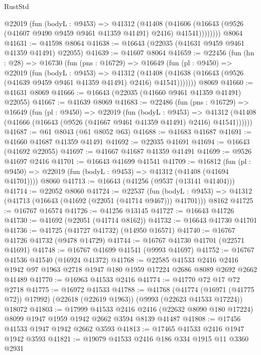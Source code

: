 \begin{lexlean}{RustStd}
\begin{coremodule}
          @22019
            (fun (bodyL : @9453) =>
            @41312
              (@41408
                (@41606
                  (@16643 (@9526 (@41607 @9490 @9459 @9461 @41359 @41491) @2416) @41541))))))))
    @8064
@41631 := @41598 @8064
@41638 := @16643 (@22035 (@41631 @9459 @9461 @41359 @41491) @22055)
@41639 := @41607 @8064
@41659 := @22456
    (fun (hn : @28) =>
    @16730
      (fun (pns : @16729) =>
      @16649
        (fun (pl : @9450) =>
        @22019
          (fun (bodyL : @9453) =>
          @41312
            (@41408 (@41638 (@16643 (@9526 (@41639 @9459 @9461 @41359 @41491) @2416) @41541)))))))
    @8069
@41660 := @41631 @8069
@41666 := @16643 (@22035 (@41660 @9461 @41359 @41491) @22055)
@41667 := @41639 @8069
@41683 := @22486
    (fun (pns : @16729) =>
    @16649
      (fun (pl : @9450) =>
      @22019
        (fun (bodyL : @9453) =>
        @41312 (@41408 (@41666 (@16643 (@9526 (@41667 @9461 @41359 @41491) @2416) @41541))))))
@41687 := @61 @8043 (@61 @8052 @63)
@41688 := @41683 @41687
@41691 := @41660 @41687 @41359 @41491
@41692 := @22035 @41691
@41694 := @16643 (@41692 @22055)
@41697 := @41667 @41687 @41359 @41491
@41699 := @9526 @41697 @2416
@41701 := @16643 @41699 @41541
@41709 := @16812
    (fun (pl : @9450) => @22019 (fun (bodyL : @9453) => @41312 (@41408 (@41694 @41701))))
    @8060
@41713 := @16643 (@41256 (@9537 (@13141 @41404)))
@41714 := @22052 @8060
@41724 := @22537
    (fun (bodyL : @9453) => @41312 (@41713 (@16643 (@41692 (@22051 (@41714 @9467))) @41701)))
    @8162
@41725 := @16767 @16574
@41726 := @41256 @13145
@41727 := @16643 @41726
@41730 := @41692 (@22051 (@41714 @8162))
@41732 := @16643 @41730 @41701
@41736 := @41725 (@41727 @41732) (@14950 @16571)
@41740 := @16767 @41726 @41732 (@9478 @14729)
@41744 := @16767 @41730 @41701 (@22571 @41691)
@41748 := @16767 @41699 @41541 (@9993 @41697)
@41752 := @16767 @41536 @41540 (@16924 @41372)
@41768 := @22585
    @41533
    @2416
    @2416
    @1942
    @97
    @1963
    @2718
    @1947
    @180
    @1959
    @17224
    @2686
    @8089
    @2692
    @2662
    @41489
@41770 := @16963 @41533 @2416
@41774 := @41770 @72 @17 @72 @2718
@41775 := @16972 @41533
@41788 := @41768
    (@41774 (@16971 (@41775 @72)) @17992)
    (@22618 (@22619 @1963))
    (@9993 (@22623 @41533 @17224))
    @18072
@41803 := @17999
    @41533
    @2416
    @2416
    (@22632 @8090 @180 @17224)
    @8099
    @1947
    @1959
    @1942
    @2662
    @3594
    @8139
    @41487
@41808 := @17456 @41533 @1947 @1942 @2662 @3593
@41813 := @17465 @41533 @2416 @1947 @1942 @3593
@41821 := @19079 @41533 @2416 @186 @334 @1915 @11 @3360 @2931

\end{coremodule}
\end{lexlean}
